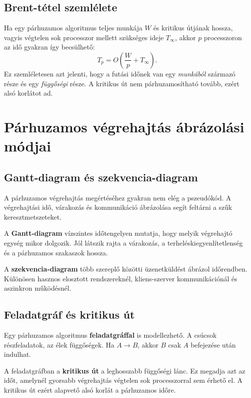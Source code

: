 \subsection{Brent-tétel szemlélete}

Ha egy párhuzamos algoritmus teljes munkája $W$ és kritikus útjának hossza, vagyis végtelen sok processzor mellett szükséges ideje $T_\infty$, akkor $p$ processzoron az idő gyakran így becsülhető:
\[
  T_p = O\left(\frac{W}{p}+T_\infty\right).
\]
Ez szemléletesen azt jelenti, hogy a futási időnek van egy \emph{munkából} származó része és egy \emph{függőségi} része. A kritikus út nem párhuzamosítható tovább, ezért alsó korlátot ad.

\section{Párhuzamos végrehajtás ábrázolási módjai}

\subsection{Gantt-diagram és szekvencia-diagram}

A párhuzamos végrehajtás megértéséhez gyakran nem elég a pszeudókód. A végrehajtási idő, várakozás és kommunikáció ábrázolása segít feltárni a szűk keresztmetszeteket.



A \textbf{Gantt-diagram} vízszintes időtengelyen mutatja, hogy melyik végrehajtó egység mikor dolgozik. Jól látszik rajta a várakozás, a terheléskiegyenlítetlenség és a párhuzamos szakaszok hossza.

A \textbf{szekvencia-diagram} több szereplő közötti üzenetküldést ábrázol időrendben. Különösen hasznos elosztott rendszereknél, kliens-szerver kommunikációnál és aszinkron működésnél.

\subsection{Feladatgráf és kritikus út}

Egy párhuzamos algoritmus \textbf{feladatgráffal} is modellezhető. A csúcsok részfeladatok, az élek függőségek. Ha $A\to B$, akkor $B$ csak $A$ befejezése után indulhat.

A feladatgráfban a \textbf{kritikus út} a leghosszabb függőségi lánc. Ez megadja azt az időt, amelynél gyorsabb végrehajtás végtelen sok processzorral sem érhető el. A kritikus út ezért alapvető alsó korlát a párhuzamos időre.

